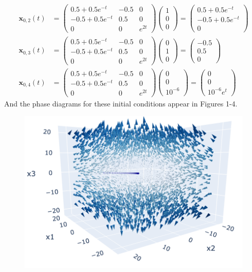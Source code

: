 \documentclass[12pt]{article}
\begin{document}
\begin{enumerate}
\begin{align*}
\mathbf{x}_{0,2}(t)&=\begin{pmatrix} 0.5+0.5e^{-t} & -0.5 & 0\\ -0.5+0.5e^{-t} & 0.5 & 0\\ 0 & 0 & e^{2t}\end{pmatrix} \begin{pmatrix} 1\\ 0\\ 0 \end{pmatrix} = \begin{pmatrix} 0.5+0.5e^{-t}\\ -0.5+0.5e^{-t}\\ 0 \end{pmatrix}\\
\mathbf{x}_{0,3}(t)&=\begin{pmatrix} 0.5+0.5e^{-t} & -0.5 & 0\\ -0.5+0.5e^{-t} & 0.5 & 0\\ 0 & 0 & e^{2t}\end{pmatrix} \begin{pmatrix} 0\\ 1\\ 0 \end{pmatrix} = \begin{pmatrix} -0.5\\ 0.5\\ 0 \end{pmatrix}\\
\mathbf{x}_{0,4}(t)&=\begin{pmatrix} 0.5+0.5e^{-t} & -0.5 & 0\\ -0.5+0.5e^{-t} & 0.5 & 0\\ 0 & 0 & e^{2t}\end{pmatrix} \begin{pmatrix} 0\\ 0\\ 10^{-6} \end{pmatrix} = \begin{pmatrix} 0\\ 0\\ 10^{-6}e^{t} \end{pmatrix}
\end{align*}
And the phase diagrams for these initial conditions appear in Figures 1-4.
\begin{figure}[h!]
    \centering
    \includegraphics[width=1\textwidth]{Figures/1.png}

\end{figure}
\end{enumerate}
\end{document}
